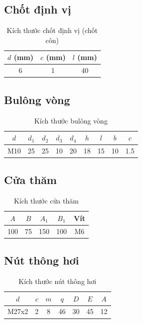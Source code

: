 \documentclass[12pt,a4paper]{report}
\begin{document}
\subsection{Chốt định vị}
\begin{table}[H]
    \centering
    \caption{Kích thước chốt định vị (chốt côn)}
    \label{tab:5.3}
    \begin{tabular}{|c|c|c|}
        \hline
        $d$ (mm) & $c$ (mm) & $l$ (mm) \\
        \hline
        6 & 1 & 40 \\
        \hline
    \end{tabular}
\end{table}

\subsection{Bulông vòng}
\begin{table}[H]
    \centering
    \caption{Kích thước bulông vòng}
    \label{tab:5.4}
    \begin{tabular}{|c|c|c|c|c|c|c|c|c|}
        \hline
        $d$ & $d_1$ & $d_2$ & $d_3$ & $d_4$ & $h$ & $l$ & $b$ & $c$ \\
        \hline
        M10 & 25 & 25 & 10 & 20 & 18 & 15 & 10 & 1.5 \\
        \hline
    \end{tabular}
\end{table}

\subsection{Cửa thăm}
\begin{table}[H]
    \centering
    \caption{Kích thước cửa thăm}
    \label{tab:5.5}
    \begin{tabular}{|c|c|c|c|c|}
        \hline
        $A$ & $B$ & $A_1$ & $B_1$ & Vít \\
        \hline
        100 & 75 & 150 & 100 & M6 \\
        \hline
    \end{tabular}
\end{table}

\subsection{Nút thông hơi}
\begin{table}[H]
    \centering
    \caption{Kích thước nút thông hơi}
    \label{tab:5.6}
    \begin{tabular}{|c|c|c|c|c|c|c|}
        \hline
        $d$ & $c$ & $m$ & $q$ & $D$ & $E$ & $A$ \\
        \hline
        M27x2 & 2 & 8 & 46 & 30 & 45 & 12 \\
        \hline
    \end{tabular}
\end{table}
\end{document}
